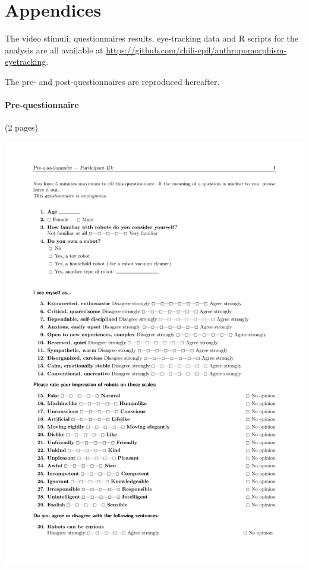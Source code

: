 \documentclass[lettersize, noapacite, twoside, HRI]{apa_HRI}
\begin{document}
\section{Appendices}

The video stimuli, questionnaires results, eye-tracking data and R scripts for
the analysis are all available at
\url{https://github.com/chili-epfl/anthropomorphism-eyetracking}.

The pre- and post-questionnaires are reproduced hereafter.
\vfill
\pagebreak
\paragraph{Pre-questionnaire} (2 pages)

\begin{center}
    \includegraphics[width=0.9\linewidth]{pre-questionnaire}


\end{center}
\end{document}
